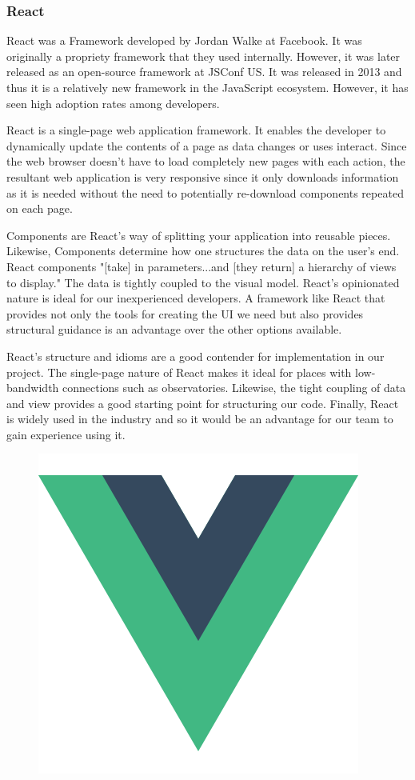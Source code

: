 \documentclass[12pt]{report}
\begin{document}
\begin{enumerate}
\subsubsection*{React}

React was a Framework developed by Jordan Walke at Facebook. It was originally a propriety framework that they used internally. However, it was later released as an open-source framework at JSConf US.\cite{reactlaunch} It was released in 2013 and thus it is a relatively new framework in the JavaScript ecosystem.\cite{reactlaunch} However, it has seen high adoption rates among developers.

React is a single-page web application framework. It enables the developer to dynamically update the contents of a page as data changes or uses interact. Since the web browser doesn't have to load completely new pages with each action, the resultant web application is very responsive since it only downloads information as it is needed without the need to potentially re-download components repeated on each page.

Components are React's way of splitting your application into reusable pieces. Likewise, Components determine how one structures the data on the user's end. React components "[take] in parameters...and [they return] a hierarchy of views to display."\cite{reacttutorial} The data is tightly coupled to the visual model. React's opinionated nature is ideal for our inexperienced developers. A framework like React that provides not only the tools for creating the UI we need but also provides structural guidance is an advantage over the other options available.

React's structure and idioms are a good contender for implementation in our project. The single-page nature of React makes it ideal for places with low-bandwidth connections such as observatories. Likewise, the tight coupling of data and view provides a good starting point for structuring our code. Finally, React is widely used in the industry and so it would be an advantage for our team to gain experience using it.

\newpage

\begin{figure}[h]
	\centering
	\includegraphics[width=0.25\linewidth]{vue}
\end{figure}


\end{enumerate}
\end{document}
